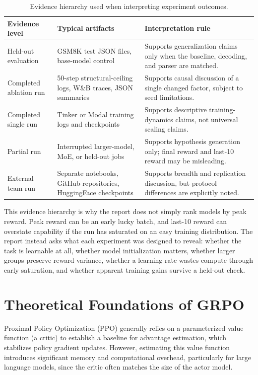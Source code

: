 \documentclass[12pt,a4paper]{report}
\begin{document}
\begin{table}[ht]
\centering
\caption{Evidence hierarchy used when interpreting experiment outcomes.}
\label{tab:evidence-hierarchy}
\footnotesize
\begin{tabularx}{\textwidth}{p{3.0cm}p{3.5cm}X}
\toprule
Evidence level & Typical artifacts & Interpretation rule\\
\midrule
Held-out evaluation & GSM8K test JSON files, base-model control & Supports generalization claims only when the baseline, decoding, and parser are matched.\\
Completed ablation run & 50-step structural-ceiling logs, W\&B traces, JSON summaries & Supports causal discussion of a single changed factor, subject to seed limitations.\\
Completed single run & Tinker or Modal training logs and checkpoints & Supports descriptive training-dynamics claims, not universal scaling claims.\\
Partial run & Interrupted larger-model, MoE, or held-out jobs & Supports hypothesis generation only; final reward and last-10 reward may be misleading.\\
External team run & Separate notebooks, GitHub repositories, HuggingFace checkpoints & Supports breadth and replication discussion, but protocol differences are explicitly noted.\\
\bottomrule
\end{tabularx}
\end{table}

This evidence hierarchy is why the report does not simply rank models by peak reward. Peak reward can be an early lucky batch, and last-10 reward can overstate capability if the run has saturated on an easy training distribution. The report instead asks what each experiment was designed to reveal: whether the task is learnable at all, whether model initialization matters, whether larger groups preserve reward variance, whether a learning rate wastes compute through early saturation, and whether apparent training gains survive a held-out check.

\section{Theoretical Foundations of GRPO}
\label{sec:grpo-loop}

Proximal Policy Optimization (PPO) generally relies on a parameterized value function (a critic) to establish a baseline for advantage estimation, which stabilizes policy gradient updates. However, estimating this value function introduces significant memory and computational overhead, particularly for large language models, since the critic often matches the size of the actor model. 
\end{document}
